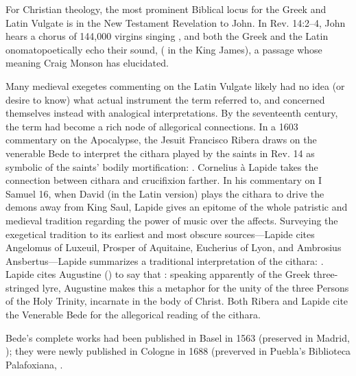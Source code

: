 For Christian theology, the most prominent Biblical locus for the Greek
 and Latin Vulgate  is in the New Testament
Revelation to John.
In Rev. 14:2--4, John hears a chorus of 144,000 virgins singing , and both the Greek and the Latin onomatopoetically
echo their sound, 
( in the King James), a passage whose
meaning Craig Monson has elucidated.%
    \autocite[88--95]{Monson:DivasConvent}

Many medieval exegetes commenting on the Latin Vulgate likely had no idea (or
desire to know) what actual instrument the term  referred to, and
concerned themselves instead with analogical interpretations.
By the seventeenth century, the term had become a rich node of allegorical
connections.
In a 1603 commentary on the Apocalypse, the Jesuit Francisco Ribera draws on
the venerable Bede to interpret the cithara played by the saints in Rev. 14 as
symbolic of the saints' bodily mortification: .%
    \Autocite[429]{Ribera:Apocalypse}
Cornelius à Lapide takes the connection between cithara and crucifixion
farther.  
In his commentary on I Samuel 16, when David (in the Latin version) plays the
cithara to drive the demons away from King Saul, Lapide gives an epitome of the
whole patristic and medieval tradition regarding the power of music over the
affects.
Surveying the exegetical tradition to its earliest and most obscure
sources---Lapide cites Angelomus of Luxeuil, Prosper of Aquitaine, Eucherius of
Lyon, and Ambrosius Ansbertus---Lapide summarizes a traditional interpretation
of the cithara: .%
    \Autocite[370]{Lapide:1Samuel}
Lapide cites Augustine () to say that : speaking apparently of the Greek
three-stringed lyre, Augustine makes this a metaphor for the unity of the three
Persons of the Holy Trinity, incarnate in the body of Christ.%
    \Autocite[370]{Lapide:1Samuel}
Both Ribera and Lapide cite the Venerable Bede for the allegorical reading of
the cithara.%
\begin{Footnote}
    Bede's complete works had been published in Basel in 1563 (preserved in
    Madrid, ); they were newly published in Cologne in 1688
    (preverved in Puebla's Biblioteca Palafoxiana, .
\end{Footnote}
